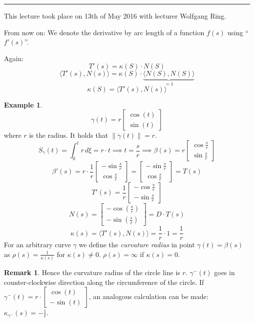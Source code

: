 \documentclass[a4paper,landscape,twocolumn]{article}
\theoremstyle{definition}
\newtheorem{rem}{Remark}
\newtheorem{ex}{Example}
\newcommand\meta[3]{\hrule{} This #1 took place on #2 with lecturer #3.\par}
\newcommand\norm[1]{\left\|#1\right\|}
\begin{document}
\meta{lecture}{13th of May 2016}{Wolfgang Ring}

From now on: We denote the derivative by arc length of a function $f(s)$ using \enquote{$f'(s)$}.

Again:
\[ T'(s) = \kappa(S) \cdot N(S) \]
\[ \langle T'(s), N(s)\rangle = \kappa(S) \cdot \underbrace{\langle N(S), N(S)\rangle}_{=1} \]
\[ \kappa(S) = \langle T'(s), N(s)\rangle \]

\begin{ex}
  \[ \gamma(t) = r \begin{bmatrix} \cos(t) \\ \sin(t) \end{bmatrix} \]
  where $r$ is the radius. It holds that $\norm{\dot{\gamma}(t)} = r$.
  \[
    S_{\gamma}(t) = \int_0^t r \, d\xi = r \cdot t
    \implies t = \frac{s}{r}
    \implies \beta(s) = r \begin{bmatrix} \cos{\frac{s}{r}} \\ \sin{\frac{s}{r}} \end{bmatrix}
  \] \[
    \beta'(s) = r \cdot \frac1{r} \begin{bmatrix}
      -\sin{\frac{s}{r}} \\
      \cos{\frac{s}{r}}
    \end{bmatrix}
    = \begin{bmatrix}
      -\sin{\frac{s}{r}} \\
      \cos{\frac{s}{r}}
    \end{bmatrix}
    = T(s)
  \] \[
    T'(s) = \frac1r \begin{bmatrix}
      -\cos{\frac{s}{r}} \\
      -\sin{\frac{s}{r}}
    \end{bmatrix}
  \] \[
    N(s) = \begin{bmatrix}
      - \cos(\frac{s}{r}) \\
      - \sin(\frac{s}{r})
    \end{bmatrix} = D \cdot T(s)
  \] \[
    \kappa(s) = \langle T'(s), N(s)\rangle
    = \frac{1}{r} \cdot 1
    = \frac{1}{r}
  \]
  For an arbitrary curve $\gamma$ we define the \emph{curvature radius} in
  point $\gamma(t) = \beta(s)$ as $\rho(s) = \frac{1}{\kappa(s)}$
  for $\kappa(s) \neq 0$.
  $\rho(s) = \infty$ if $\kappa(s) = 0$.
\end{ex}

\begin{rem}
  Hence the curvature radius of the circle line is $r$.
  $\gamma^-(t)$ goes in counter-clockwise direction along the circumference of the circle.
  If $\gamma^-(t) = r \cdot \begin{bmatrix} \cos(t) \\ -\sin(t) \end{bmatrix}$,
  an analogous calculation can be made:
  $\kappa_{\gamma^{-}}(s) = -\frac{1}{r}$.
\end{rem}
\end{document}
